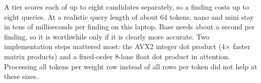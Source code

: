 \documentclass[conference]{IEEEtran}
\begin{document}
\begin{table}[t]
\centering
\caption{Assist tiers: shape, size, and median (minimum) time per scored candidate over 5 trials
of 30 queries, one thread, Intel Core~5 120U (15\,W) with $\approx$40\% background CPU load.
Full context = 128/256/384 tokens.}
\label{tab:tiers}
\footnotesize
\setlength{\tabcolsep}{3pt}
\end{table}

A tier scores each of up to eight candidates separately, so a finding costs up to eight queries.
At a realistic query length of about 64 tokens, nano and mini stay in tens of milliseconds per
finding on this laptop. Base needs about a second per finding, so it is worthwhile only if it is
clearly more accurate. Two implementation steps mattered most: the AVX2 integer dot product
(4$\times$ faster matrix products) and a fixed-order 8-lane float dot product in attention.
Processing all tokens per weight row instead of all rows per token did not help at these sizes.
\end{document}
